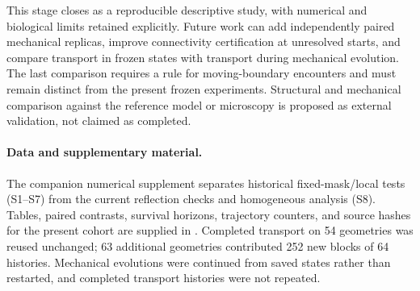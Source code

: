 This stage closes as a reproducible descriptive study, with numerical and biological limits retained explicitly. Future work can add independently paired mechanical replicas, improve connectivity certification at unresolved starts, and compare transport in frozen states with transport during mechanical evolution. The last comparison requires a rule for moving-boundary encounters and must remain distinct from the present frozen experiments. Structural and mechanical comparison against the reference model or microscopy is proposed as external validation, not claimed as completed.

\paragraph{Data and supplementary material.}
The companion numerical supplement separates historical fixed-mask/local tests (S1--S7) from the current reflection checks and homogeneous analysis (S8). Tables, paired contrasts, survival horizons, trajectory counters, and source hashes for the present cohort are supplied in . Completed transport on 54 geometries was reused unchanged; 63 additional geometries contributed 252 new blocks of 64 histories. Mechanical evolutions were continued from saved states rather than restarted, and completed transport histories were not repeated.
